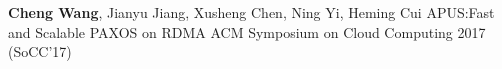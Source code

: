 \cvpub
{\textbf{Cheng Wang}, Jianyu Jiang, Xusheng Chen, Ning Yi, Heming Cui} %
{APUS:Fast and Scalable PAXOS on RDMA} %
{} %
{} %
{ %
ACM Symposium on Cloud Computing 2017 (SoCC'17)
}
